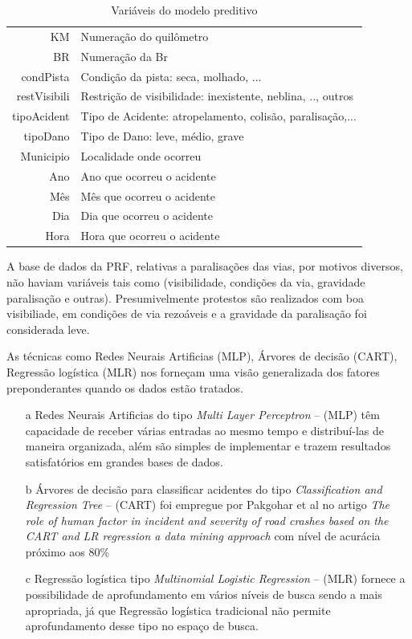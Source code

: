 \begin{table}[htbp]
  \caption{Variáveis do modelo preditivo}
  
  \begin{tabular}{r|l} \hline
   KM & Numeração do quilômetro \\
    BR & Numeração da Br\\
    condPista & Condição da pista: seca, molhado, ... \\
    restVisibili & Restrição de visibilidade: inexistente, neblina, .., outros \\
    tipoAcident & Tipo de Acidente: atropelamento, colisão, paralisação,...\\
    tipoDano  & Tipo de Dano: leve, médio, grave \\
    Municipio  & Localidade onde ocorreu \\
    Ano & Ano que ocorreu o acidente \\
    Mês & Mês que ocorreu o acidente \\
    Dia & Dia que ocorreu o acidente \\
    Hora & Hora que ocorreu o acidente \\
  \end{tabular}
\end{table}

 
A base de dados da PRF, relativas a paralisações das vias, por motivos diversos, não haviam variáveis tais como (visibilidade, condições da via, gravidade paralisação e outras).
Presumivelmente protestos são realizados com boa visibiliade, em condições de via rezoáveis e a gravidade da paralisação foi considerada leve.

As técnicas como Redes Neurais Artificias (MLP), Árvores de decisão (CART), Regressão logística (MLR) nos forneçam uma
visão generalizada dos fatores preponderantes quando os dados estão tratados.

\begin{itemize}
 \item[a] Redes Neurais Artificias do tipo \textit{ Multi Layer Perceptron}  -- (MLP) têm capacidade de receber várias entradas ao mesmo tempo e distribuí-las de maneira organizada, além 
	  são simples de implementar e trazem resultados satisfatórios em grandes bases de dados.
 
 \item[b] Árvores de decisão para classificar acidentes do tipo \textit{ Classification and Regression Tree}  -- (CART) foi empregue por Pakgohar et al no artigo 
	  \textit{The role of human factor in incident and severity of road crashes based on the CART and LR regression a data mining approach}  com nível de acurácia próximo aos 80\%

 \item[c] Regressão logística tipo \textit{Multinomial Logistic Regression} -- (MLR) fornece a possibilidade de aprofundamento em vários níveis de busca sendo a mais apropriada, já que Regressão logística 
	  tradicional não permite aprofundamento desse tipo no espaço de busca.
\end{itemize}



